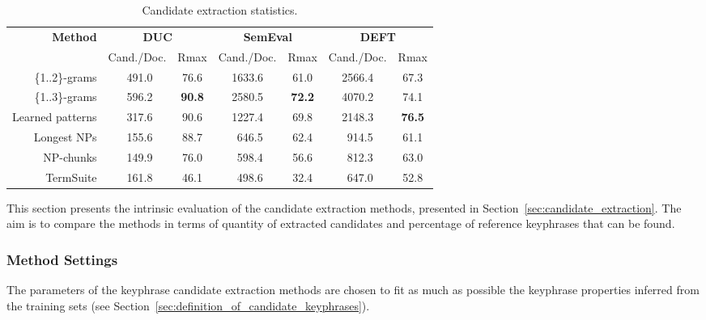     \begin{table*}
      \centering
      \begin{tabular}{rcccccc}
        \toprule
        \multirow{2}{*}[-2pt]{\textbf{Method}} & \multicolumn{2}{c}{\textbf{DUC}} & \multicolumn{2}{c}{\textbf{SemEval}} & \multicolumn{2}{c}{\textbf{DEFT}}\\
        \cmidrule(r){2-3}\cmidrule(lr){4-5}\cmidrule(l){6-7}
        & Cand./Doc. & Rmax & Cand./Doc. & Rmax & Cand./Doc. & Rmax\\
        \midrule
        \{1..2\}-grams & $~~$491.0 & 76.6 & 1633.6 & 61.0 & 2566.4 & 67.3\\
        \{1..3\}-grams & $~~$596.2 & \textbf{90.8} & 2580.5 & \textbf{72.2} & 4070.2 & 74.1\\
        Learned patterns & $~~$317.6 & 90.6 & 1227.4 & 69.8 & 2148.3 & \textbf{76.5}\\
        Longest NPs & $~~$155.6 & 88.7 & $~~$646.5 & 62.4 & $~~$914.5 & 61.1\\
        NP-chunks & $~~$149.9 & 76.0 & $~~$598.4 & 56.6 & $~~$812.3 & 63.0\\
        TermSuite & $~~$161.8 & 46.1 & $~~$498.6 & 32.4 & $~~$647.0 & 52.8\\
        \bottomrule
      \end{tabular}
      \caption{Candidate extraction statistics.
               \label{tab:candidate_extraction_statistics}}
    \end{table*}

    This section presents the intrinsic evaluation of the candidate extraction
    methods, presented in Section~\ref{sec:candidate_extraction}. The aim is to
    compare the methods in terms of quantity of extracted candidates and
    percentage of reference keyphrases that can be found.

    \subsubsection{Method Settings}
    \label{subsubsec:method_settings}
      The parameters of the keyphrase candidate extraction methods are chosen to
      fit as much as possible the keyphrase properties inferred from the
      training sets (see Section~\ref{sec:definition_of_candidate_keyphrases}).

